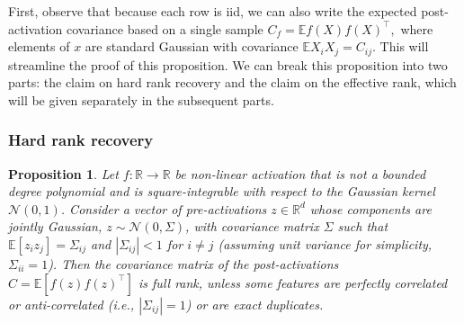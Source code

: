 \documentclass{article}
\newcommand{\R}{\mathbb{R}}
\newcommand{\E}{\mathbb{E}}
\newtheorem{proposition}{Proposition}[section]
\numberwithin{figure}{section}
\begin{document}
First, observe that because each row is iid, we can also write the expected post-activation covariance based on a single sample $C_f = \E f(X) f(X)^\top,$ where elements of $x$ are standard Gaussian with covariance $\E X_i X_j = C_{ij}. $ This will streamline the proof of this proposition.  We can break this proposition into two parts: the claim on hard rank recovery and the claim on the effective rank, which will be given separately in the subsequent parts. 


\subsubsection*{Hard rank recovery}

\begin{proposition}
\label{prop:rank}
Let $f:\R\to\R$ be non-linear activation that is not a bounded degree polynomial and is square-integrable with respect to the Gaussian kernel $\mathcal{N}(0,1)$. Consider a vector of pre-activations $z\in\R^d$ whose components are jointly Gaussian, $z \sim \mathcal{N}(0, \Sigma)$, with covariance matrix $\Sigma$ such that $\E[z_i z_j]=\Sigma_{ij}$ and $|\Sigma_{ij}|<1$ for $i \neq j$ (assuming unit variance for simplicity, $\Sigma_{ii}=1$). Then the covariance matrix of the post-activations $C = \E[f(z)f(z)^\top]$ is full rank, unless some features are perfectly correlated or anti-correlated (i.e., $|\Sigma_{ij}|=1$) or are exact duplicates.
\end{proposition}
\end{document}
